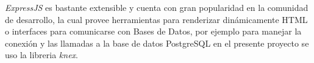 
  \emph{ExpressJS} es bastante extensible y cuenta con gran popularidad en la comunidad de desarrollo, la cual provee herramientas para renderizar dinámicamente HTML o interfaces para comunicarse con Bases de Datos, por ejemplo para manejar la conexión y las llamadas a la base de datos PostgreSQL en el presente proyecto se uso la libreria \emph{knex}.



